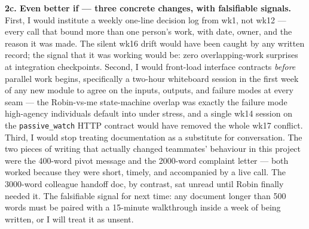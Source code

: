 \textbf{2c. Even better if --- three concrete changes, with falsifiable signals.}
First, I would institute a weekly one-line decision log from wk1, not wk12 --- every call that bound more than one person's work, with date, owner, and the reason it was made. The silent wk16 drift would have been caught by any written record; the signal that it was working would be: zero overlapping-work surprises at integration checkpoints. Second, I would front-load interface contracts \emph{before} parallel work begins, specifically a two-hour whiteboard session in the first week of any new module to agree on the inputs, outputs, and failure modes at every seam --- the Robin-vs-me state-machine overlap was exactly the failure mode high-agency individuals default into under stress, and a single wk14 session on the \texttt{passive\_watch} HTTP contract would have removed the whole wk17 conflict. Third, I would stop treating documentation as a substitute for conversation. The two pieces of writing that actually changed teammates' behaviour in this project were the 400-word pivot message and the 2000-word complaint letter --- both worked because they were short, timely, and accompanied by a live call. The 3000-word colleague handoff doc, by contrast, sat unread until Robin finally needed it. The falsifiable signal for next time: any document longer than 500 words must be paired with a 15-minute walkthrough inside a week of being written, or I will treat it as unsent.
